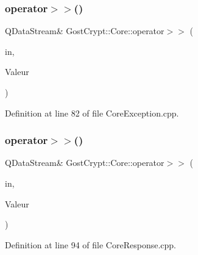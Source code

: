 \mbox{\label{namespace_gost_crypt_1_1_core_a40fb37b07aef0ae9cdde50760e93e18f}} 
\subsubsection{\texorpdfstring{operator$>$$>$()}{operator>>()}\hspace{0.1cm}{\footnotesize\ttfamily [12/56]}}
{\footnotesize\ttfamily Q\+Data\+Stream\& Gost\+Crypt\+::\+Core\+::operator$>$$>$ (\begin{DoxyParamCaption}\item[{Q\+Data\+Stream \&}]{in,  }\item[{\hyperlink{class_gost_crypt_1_1_core_1_1_volume_not_mounted}{Gost\+Crypt\+::\+Core\+::\+Volume\+Not\+Mounted} \&}]{Valeur }\end{DoxyParamCaption})}



Definition at line 82 of file Core\+Exception.\+cpp.

\mbox{\label{namespace_gost_crypt_1_1_core_a3b0ff848a75ff639ef1e6fb9b517dda7}} 
\subsubsection{\texorpdfstring{operator$>$$>$()}{operator>>()}\hspace{0.1cm}{\footnotesize\ttfamily [13/56]}}
{\footnotesize\ttfamily Q\+Data\+Stream\& Gost\+Crypt\+::\+Core\+::operator$>$$>$ (\begin{DoxyParamCaption}\item[{Q\+Data\+Stream \&}]{in,  }\item[{\hyperlink{struct_gost_crypt_1_1_core_1_1_create_key_file_response}{Create\+Key\+File\+Response} \&}]{Valeur }\end{DoxyParamCaption})}



Definition at line 94 of file Core\+Response.\+cpp.

\mbox{\label{namespace_gost_crypt_1_1_core_a7c7d4ab2445884a3e33a34ca820ee164}} 
